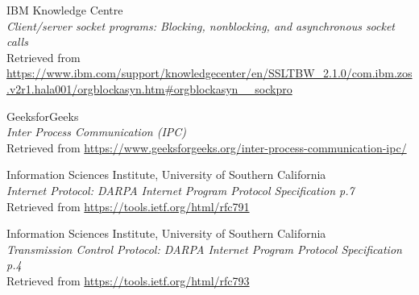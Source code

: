 \documentclass[11pt]{article}
\begin{document}
\begin{thebibliography}{9}
\begin{flushleft}
	IBM Knowledge Centre \\
	\textit{Client/server socket programs: Blocking, nonblocking, and asynchronous socket calls} \\
	Retrieved from \url{https://www.ibm.com/support/knowledgecenter/en/SSLTBW_2.1.0/com.ibm.zos.v2r1.hala001/orgblockasyn.htm#orgblockasyn__sockpro}
\end{flushleft}

\begin{flushleft}
	GeeksforGeeks \\
	\textit{Inter Process Communication (IPC)} \\
	Retrieved from \url{https://www.geeksforgeeks.org/inter-process-communication-ipc/}
\end{flushleft}


\begin{flushleft}
	Information Sciences Institute, University of Southern California \\
	\textit{Internet Protocol: DARPA Internet Program Protocol Specification p.7} \\
	Retrieved from \url{https://tools.ietf.org/html/rfc791}
\end{flushleft}

\begin{flushleft}
	Information Sciences Institute, University of Southern California \\
	\textit{Transmission Control Protocol: DARPA Internet Program Protocol Specification p.4} \\
	Retrieved from \url{https://tools.ietf.org/html/rfc793}
\end{flushleft}






\end{thebibliography}
\end{document}
